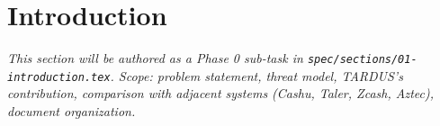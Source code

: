 \section{Introduction}
\label{sec:introduction}

\textit{This section will be authored as a Phase 0 sub-task in \texttt{spec/sections/01-introduction.tex}. Scope: problem statement, threat model, TARDUS's contribution, comparison with adjacent systems (Cashu, Taler, Zcash, Aztec), document organization.}
